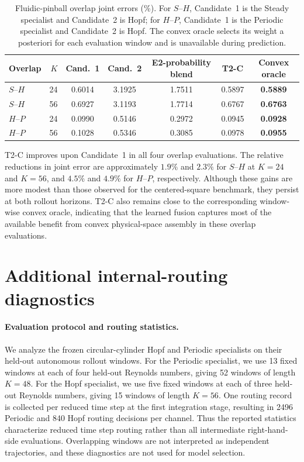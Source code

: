 \documentclass{article}
\begin{document}
\par
\begin{table}[H]
\centering
\caption{
Fluidic-pinball overlap joint errors (\%). For $S$--$H$, Candidate~1 is the Steady specialist and Candidate~2 is Hopf; for $H$--$P$, Candidate~1 is the Periodic specialist and Candidate~2 is Hopf.
The convex oracle selects its weight a posteriori for each evaluation window and is unavailable during prediction.
}
\label{tab:pinball_overlap}
\small
\setlength{\tabcolsep}{3.5pt}
\begin{tabular}{lrccccc}
\toprule
Overlap & $K$ & Cand.~1 & Cand.~2 & E2-probability blend & T2-C & Convex oracle \\
\midrule
$S$--$H$ & 24 & 0.6014 & 3.1925 & 1.7511 & 0.5897 & \textbf{0.5889} \\
$S$--$H$ & 56 & 0.6927 & 3.1193 & 1.7714 & 0.6767 & \textbf{0.6763} \\
$H$--$P$ & 24 & 0.0990 & 0.5146 & 0.2972 & 0.0945 & \textbf{0.0928} \\
$H$--$P$ & 56 & 0.1028 & 0.5346 & 0.3085 & 0.0978 & \textbf{0.0955} \\
\bottomrule
\end{tabular}
\end{table}
\par

T2-C improves upon Candidate~1 in all four overlap evaluations.
The relative reductions in joint error are approximately $1.9\%$ and
$2.3\%$ for $S$--$H$ at $K=24$ and $K=56$, and $4.5\%$ and $4.9\%$
for $H$--$P$, respectively. Although these gains are more modest than those observed for the centered-square benchmark, they persist at both rollout horizons. T2-C also remains close to the corresponding window-wise convex oracle, indicating that the learned fusion captures most of the available benefit from convex physical-space assembly in these overlap evaluations.

\FloatBarrier
\section{Additional internal-routing diagnostics}
\label{app:internal_routing}

\paragraph{Evaluation protocol and routing statistics.}
We analyze the frozen circular-cylinder Hopf and Periodic specialists on their held-out autonomous rollout windows.
For the Periodic specialist, we use 13 fixed windows at each of four held-out Reynolds numbers, giving 52 windows of length $K=48$. For the Hopf specialist, we use five fixed windows at each of three held-out Reynolds numbers, giving 15 windows of length $K=56$. One routing record is collected per reduced time step at the first integration stage, resulting in 2496 Periodic and 840 Hopf routing decisions per channel. Thus the reported statistics characterize reduced time step routing rather than all intermediate right-hand-side evaluations. Overlapping windows are not interpreted as independent trajectories, and these diagnostics are not used for model selection.
\end{document}
